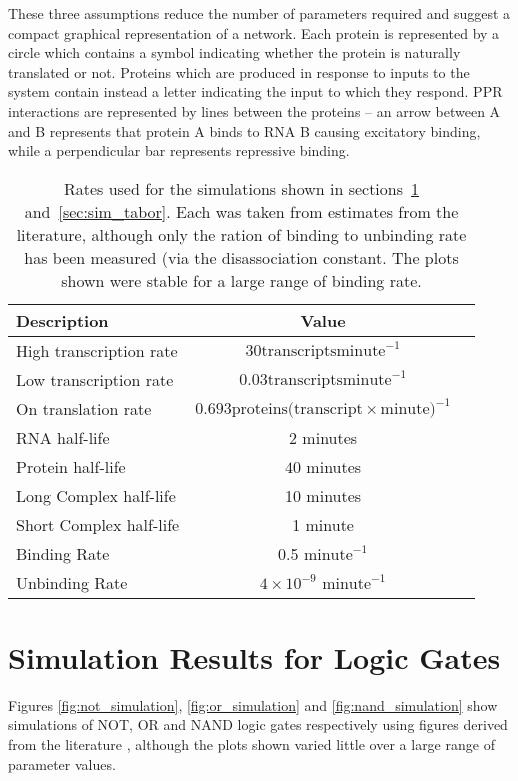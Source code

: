 These three assumptions reduce the number of parameters required and suggest a
compact graphical representation of a network.
Each protein is represented by a circle which contains a symbol indicating
whether the protein is naturally translated or not.
Proteins which are produced in response to inputs to the system contain instead 
a letter indicating the input to which they respond.
PPR interactions are represented by lines between the proteins -- an arrow
between A and B represents that protein A binds to RNA B causing excitatory
binding, while a perpendicular bar represents repressive binding.

\begin{table}
  \centering
  \begin{tabular}{l | c | c }
    Description  & Value \\ \hline
    High transcription rate & $30 \mathrm{transcripts} \mathrm{minute}^{-1}$ \\
    Low transcription rate & $0.03 \mathrm{transcripts} \mathrm{minute}^{-1}$ \\
    On translation rate & $0.693 \mathrm{proteins}
      \mathrm{(transcript}\times \mathrm{minute)}^{-1}$ \\
    RNA half-life & $2$ minutes \\
    Protein half-life & $40$ minutes \\
    Long Complex half-life & 10 minutes \\
    Short Complex half-life & 1 minute \\
    Binding Rate & 0.5 $\mathrm{minute}^{-1}$ \\
    Unbinding Rate & $4\times 10^{-9}$ $\mathrm{minute}^{-1}$ \\
  \end{tabular}
  \caption{Rates used for the simulations shown in sections~\ref{sec:sim_logic}
  and~\ref{sec:sim_tabor}. Each was taken from estimates from the literature,
  although only the ration of binding to unbinding rate has been measured (via
  the disassociation constant. The plots shown were stable for a large range of
  binding rate.}
  \label{tab:sim_values}
\end{table}

\section{Simulation Results for Logic Gates}
\label{sec:sim_logic}

Figures \ref{fig:not_simulation}, \ref{fig:or_simulation} and
\ref{fig:nand_simulation} show simulations of NOT, OR and NAND logic gates
respectively using figures derived from the literature  
\citep[see][]{So2011,Andersen1998}, 
although the plots shown varied little over a large range of parameter values.


